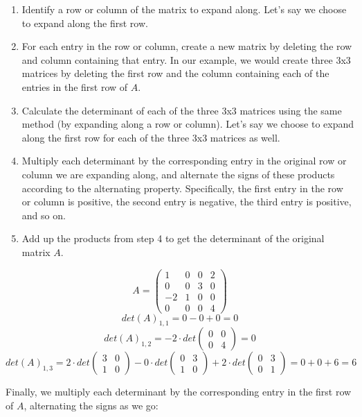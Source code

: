 \documentclass[fontsize=12pt]{scrartcl}
\begin{document}
\begin{enumerate}
	\item Identify a row or column of the matrix to expand along. Let's say we choose to expand along the first row.
	\item For each entry in the row or column, create a new matrix by deleting the row and column containing that entry. In our example, we would create three 3x3 matrices by deleting the first row and the column containing each of the entries in the first row of $A$.
	\item Calculate the determinant of each of the three 3x3 matrices using the same method (by expanding along a row or column). Let's say we choose to expand along the first row for each of the three 3x3 matrices as well.
	\item Multiply each determinant by the corresponding entry in the original row or column we are expanding along, and alternate the signs of these products according to the alternating property. Specifically, the first entry in the row or column is positive, the second entry is negative, the third entry is positive, and so on.
	\item Add up the products from step 4 to get the determinant of the original matrix $A$.
\end{enumerate}
$$A = \left(\begin{array}{cccc} 1 & 0 & 0 & 2 \\ 0 & 0 & 3 & 0 \\ -2 & 1 & 0 & 0 \\ 0 & 0 & 0 & 4 \end{array} \right) $$
$$det(A)_{1, 1} = 0 - 0 + 0 = 0 $$
$$det(A)_{1, 2} = -2 \cdot det\left(\begin{array}{cc} 0 & 0 \\ 0 & 4 \end{array} \right)  = 0$$
$$det(A)_{1, 3} = 2 \cdot det\left(\begin{array}{cc} 3 & 0 \\ 1 & 0 \end{array} \right) - 0 \cdot det\left(\begin{array}{cc} 0 & 3 \\ 1 & 0 \end{array} \right) + 2 \cdot det\left(\begin{array}{cc} 0 & 3 \\ 0 & 1 \end{array} \right) = 0 + 0 + 6 = 6$$

\noindent
Finally, we multiply each determinant by the corresponding entry in the first row of $A$, alternating the signs as we go:
\end{document}
